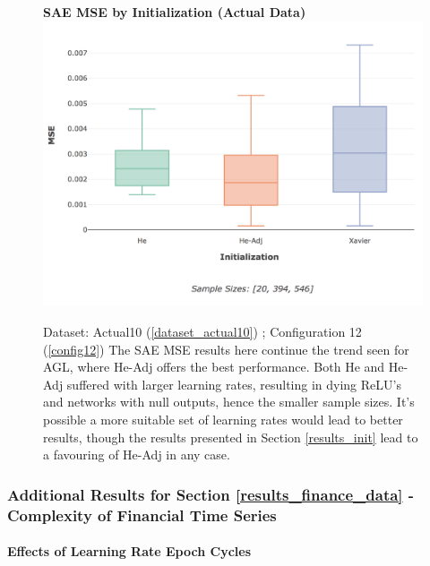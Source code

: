 \documentclass[a4paper,11pt,oneside]{article}
\theoremstyle{plain}
\theoremstyle{definition}
\begin{document}
	\begin{figure}[H]
		\centering 
		\textbf{SAE MSE by Initialization (Actual Data)} 
		\includegraphics[scale=0.3]{images/results/newinit/actual_mse_init.png}
		\caption[SAE MSE by Initialization (Actual Data)]{Dataset: Actual10 (\ref{dataset_actual10}) ; Configuration 12 (\ref{config12})
			\newline The SAE MSE results here continue the trend seen for AGL, where He-Adj offers the best performance. Both He and He-Adj suffered with larger learning rates, resulting in dying ReLU's and networks with null outputs, hence the smaller sample sizes. It's possible a more suitable set of learning rates would lead to better results, though the results presented in Section \ref{results_init} lead to a favouring of He-Adj in any case.}
		\label{figure-actual_mse_init}
	\end{figure}
	
	\subsubsection{Additional Results for Section \ref{results_finance_data} - Complexity of Financial Time Series}\label{results_appendix_finance_data}
	
	\paragraph{Effects of Learning Rate Epoch Cycles}
	
\end{document}
